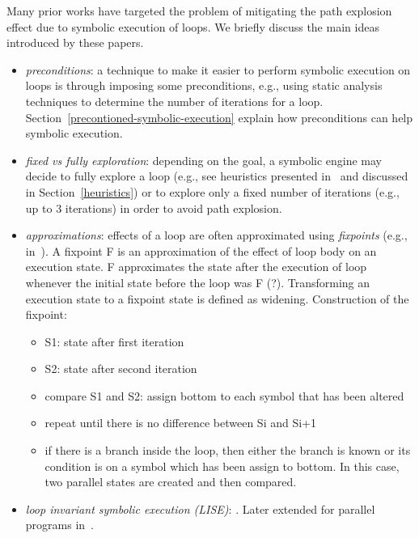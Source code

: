 Many prior works have targeted the problem of mitigating the path explosion effect due to symbolic execution of loops. We briefly discuss the main ideas introduced by these papers. 
\begin{itemize}

  \item {\em preconditions}: a technique to make it easier to perform symbolic execution on loops is through imposing some preconditions, e.g., using static analysis techniques to determine the number of iterations for a loop. Section~\ref{precontioned-symbolic-execution} explain how preconditions can help symbolic execution.

  \item {\em fixed vs fully exploration}: depending on the goal, a symbolic engine may decide to fully explore a loop (e.g., see heuristics presented in~\cite{AEG-NDSS11} and discussed in Section~\ref{heuristics}) or to explore only a fixed number of iterations (e.g., up to 3 iterations) in order to avoid path explosion.

  \item {\em approximations}: effects of a loop are often approximated using {\em fixpoints} (e.g., in~\cite{KKM-USEC05,BNS-SP06,CFB-ACSAC06}). A fixpoint F is an approximation of the effect of loop body on an execution state. F approximates the state after the execution of loop whenever the initial state before the loop was F (?). Transforming an execution state to a fixpoint state is defined as widening. Construction of the fixpoint:
  \begin{itemize}
    \item S1: state after first iteration
    \item S2: state after second iteration
    \item compare S1 and S2: assign bottom to each symbol that has been altered
    \item repeat until there is no difference between Si and Si+1
    \item if there is a branch inside the loop, then either the branch is known or its condition is on a symbol which has been assign to bottom. In this case, two parallel states are created and then compared.
  \end{itemize}

  \item {\em loop invariant symbolic execution (LISE)}: \cite{PV-SPIN04}. Later extended for parallel programs in~\cite{SZ-VMCAI12}.


\end{itemize}
